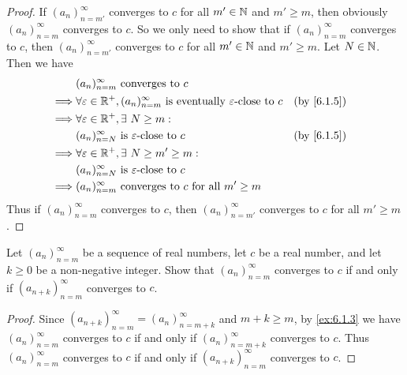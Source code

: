 \begin{proof}
  If \((a_n)_{n = m'}^\infty\) converges to \(c\) for all \(m' \in \mathbb{N}\) and \(m' \geq m\), then obviously \((a_n)_{n = m}^\infty\) converges to \(c\).
  So we only need to show that if \((a_n)_{n = m}^\infty\) converges to \(c\), then \((a_n)_{n = m'}^\infty\) converges to \(c\) for all \(m' \in \mathbb{N}\) and \(m' \geq m\).
  Let \(N \in \mathbb{N}\).
  Then we have
  \begin{align*}
             & (a_n)_{n = m}^\infty \text{ converges to } c                                                                                           \\
    \implies & \forall \varepsilon \in \R^+, (a_n)_{n = m}^\infty \text{ is eventually } \varepsilon\text{-close to } c &  & \text{(by \cref{6.1.5})} \\
    \implies & \forall \varepsilon \in \R^+, \exists\ N \geq m :                                                                                      \\
             & (a_n)_{n = N}^\infty \text{ is } \varepsilon\text{-close to } c                                          &  & \text{(by \cref{6.1.5})} \\
    \implies & \forall \varepsilon \in \R^+, \exists\ N \geq m' \geq m :                                                                              \\
             & (a_n)_{n = N}^\infty \text{ is } \varepsilon\text{-close to } c                                                                        \\
    \implies & (a_n)_{n = m}^\infty \text{ converges to } c \text{ for all } m' \geq m
  \end{align*}
  Thus if \((a_n)_{n = m}^\infty\) converges to \(c\), then \((a_n)_{n = m'}^\infty\) converges to \(c\) for all \(m' \geq m\).
\end{proof}

\begin{ex}\label{ex:6.1.4}
  Let \((a_n)_{n = m}^\infty\) be a sequence of real numbers, let \(c\) be a real number, and let \(k \geq 0\) be a non-negative integer.
  Show that \((a_n)_{n = m}^\infty\) converges to \(c\) if and only if \((a_{n + k})_{n = m}^\infty\) converges to \(c\).
\end{ex}

\begin{proof}
  Since \((a_{n + k})_{n = m}^\infty = (a_n)_{n = m + k}^\infty\) and \(m + k \geq m\), by \cref{ex:6.1.3} we have \((a_n)_{n = m}^\infty\) converges to \(c\) if and only if \((a_n)_{n = m + k}^\infty\) converges to \(c\).
  Thus \((a_n)_{n = m}^\infty\) converges to \(c\) if and only if \((a_{n + k})_{n = m}^\infty\) converges to \(c\).
\end{proof}

